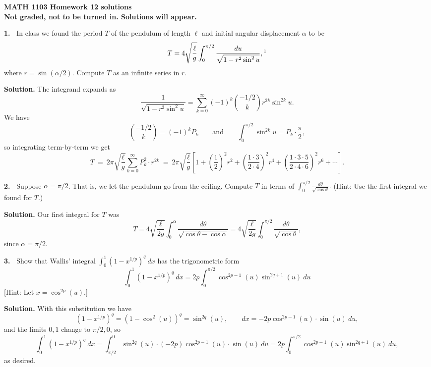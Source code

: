 \documentclass[12pt]{article}
\newcommand{\al}{\alpha}
\theoremstyle{definition}
\theoremstyle{remark}
\theoremstyle{definition}
\newenvironment{Solution}{\noindent\textbf{Solution.}}{}
\begin{document}
  

{\bf MATH 1103 Homework 12 solutions}\\
{\bf Not graded, not to be turned in. Solutions will appear.}




{\bf 1.\ } In class we found the period $T$ of the pendulum of length $\ell$ and initial angular displacement $\al$ to be 
\[T=4\sqrt{\frac{\ell}{g}}\int_0^{\pi/2}\frac{du}{\sqrt{1-r^2\sin^2 u}},\footnote{Note typos in original problem, which had $2\pi$ instead of 4 and $\sin u$ instead of $\sin^2 u$.}
\]
where $r=\sin(\al/2)$. Compute $T$ as an infinite series in $r$. 

\begin{Solution}
The integrand expands as 
\[\frac{1}{\sqrt{1-r^2\sin^2 u}}
=\sum_{k=0}^\infty(-1)^k\binom{-1/2}{k} r^{2k}\sin^{2k}u.
\]
We have 
\[\binom{-1/2}{k}=(-1)^kP_k\qquad \text{and}\qquad
\int_0^{\pi/2}\sin^{2k}u=P_k\cdot\frac{\pi}{2},
\]
so integrating term-by-term we get
\[
T\ =\ 2\pi\sqrt{\frac{\ell}{g}}\sum_{k=0}^\infty P_k^2\cdot  r^{2k}
\ =\ 2\pi\sqrt{\frac{\ell}{g}}\left[
1+\left(\frac{1}{2}\right)^2 r^2
+\left(\frac{1\cdot 3}{2\cdot 4}\right)^2 r^4
+\left(\frac{1\cdot 3\cdot 5}{2\cdot 4\cdot 6}\right)^2 r^6
+\cdots\right].
\]

\end{Solution}



{\bf 2.\ } Suppose $\al=\pi/2$. That is, we let the pendulum go from the ceiling. Compute $T$ in terms of 
$\displaystyle\int_0^{\pi/2}
\frac{d\theta}{\sqrt{\cos \theta}}.
$
(Hint: Use the first integral we found for $T$.)

\begin{Solution} Our first integral for $T$ was 
\[T=4\sqrt{\frac{\ell}{2g}}\int_0^{\al}
\frac{d\theta}{\sqrt{\cos\theta-\cos\al}}=
4\sqrt{\frac{\ell}{2g}}\int_0^{\pi/2}
\frac{d\theta}{\sqrt{\cos\theta}},
\]
since $\al=\pi/2$. 
\end{Solution}

{\bf 3.\ } Show that Wallis' integral $\int_0^1(1-x^{1/p})^q\ dx$ 
has the trigonometric form
\[
\int_0^1(1-x^{1/p})^q\ dx=2p\int_0^{\pi/2}\cos^{2p-1}(u)\sin^{2q+1}(u)\ du
\]
[Hint: Let $x=\cos^{2p}(u)$.]

\begin{Solution} With this substitution we have 
\[(1-x^{1/p})^q=(1-\cos^2(u))^q=\sin^{2q}(u),\qquad
dx=-2p\cos^{2p-1}(u)\cdot\sin(u)\ du,
\]
and the limits $0,1$ change to $\pi/2, 0$, so 
\[
\int_0^1(1-x^{1/p})^q\ dx=
\int_{\pi/2}^0\sin^{2q}(u)\cdot (-2p)\cos^{2p-1}(u)\cdot\sin(u)\ du
=2p\int_0^{\pi/2}\cos^{2p-1}(u)\sin^{2q+1}(u)\ du,
\]
as desired.
\end{Solution}
\end{document}
